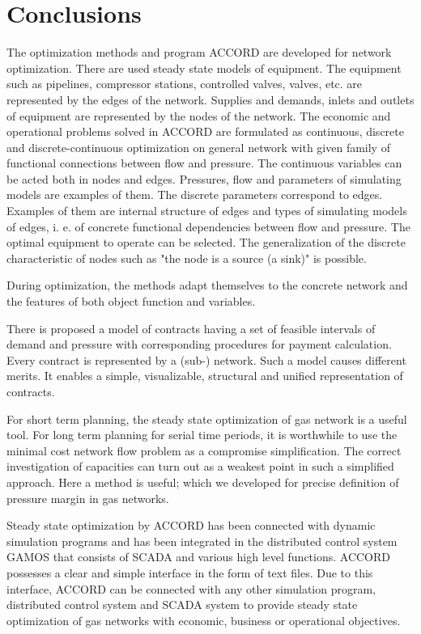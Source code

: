 \documentclass{article}
\begin{document}
\section{Conclusions}

The optimization methods and program ACCORD are developed for network
optimization. There are used steady state models of equipment. The equipment
such as pipelines, compressor stations, controlled valves, valves, etc. are
represented by the edges of the network. Supplies and demands, inlets and
outlets of equipment are represented by the nodes of the network. The
economic and operational problems solved in ACCORD are formulated as
continuous, discrete and discrete-continuous optimization on general network
with given family of functional connections between flow and pressure. The
continuous variables can be acted both in nodes and edges. Pressures, flow
and parameters of simulating models are examples of them. The discrete
parameters correspond to edges. Examples of them are internal structure of
edges and types of simulating models of edges, i. e. of concrete functional
dependencies between flow and pressure. The optimal equipment to operate can
be selected. The generalization of the discrete characteristic of nodes such
as "the node is a source (a sink)" is possible.

During optimization, the methods adapt themselves to the concrete network
and the features of both object function and variables.

There is proposed a model of contracts having a set of feasible intervals of
demand and pressure with corresponding procedures for payment calculation.
Every contract is represented by a (sub-) network. Such a model causes
different merits. It enables a simple, visualizable, structural and unified
representation of contracts.

For short term planning, the steady state optimization of gas network is a
useful tool. For long term planning for serial time periods, it is
worthwhile to use the minimal cost network flow problem as a compromise
simplification. The correct investigation of capacities can turn out as a
weakest point in such a simplified approach. Here a method \cite{9 0-93} is
useful; which we developed for precise definition of pressure margin in gas
networks.

Steady state optimization by ACCORD has been connected with dynamic
simulation programs and has been integrated in the distributed control
system GAMOS that consists of SCADA and various high level functions. ACCORD
possesses a clear and simple interface in the form of text files. Due to
this interface, ACCORD can be connected with any other simulation program,
distributed control system and SCADA system to provide steady state
optimization of gas networks with economic, business or operational
objectives.
\end{document}
